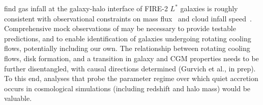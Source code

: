 \documentclass[fleqn,usenatbib]{mnras}
\begin{document}

\cite{Trapp2021} find gas infall at the galaxy-halo interface of FIRE-2 $L^*$ galaxies is roughly consistent with observational constraints on mass flux~\citep[e.g.][]{Putman2012, Rohser2016} and cloud infall speed~\citep[e.g.][]{Zheng2017, Werk2019, Bish2019, Ho2020}.
Comprehensive mock observations of may be necessary to provide testable predictions, and to enable identification of galaxies undergoing rotating cooling flows, potentially including our own.
The relationship between rotating cooling flows, disk formation, and a transition in galaxy and CGM properties needs to be further disentangled, with causal directions determined (Gurvich et al., in prep).
To this end, analyses that probe the parameter regime over which quiet accretion occurs in cosmological simulations (including redshift and halo mass) would be valuable.
\end{document}
